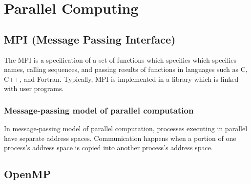 \chapter{Parallel Computing}

\section{MPI (Message Passing Interface)}
The MPI is a specification of a set of functions
which specifies which specifies names, calling sequences, and passing results
of functions in languages such as C, C++, and Fortran. 
Typically, MPI is implemented in a library which is linked with user programs.

\subsection{Message-passing model of parallel computation}
In message-passing model of parallel computation, processes executing in
parallel have separate address spaces. Communication happens when a portion of
one process's address space is copied into another process's address space.

\section{OpenMP}

